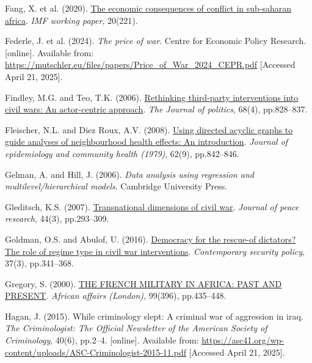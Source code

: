 \documentclass[
]{article}
\newlength{\cslhangindent}
\newenvironment{CSLReferences}[2] %
 {\begin{list}{}{%
  \setlength{\itemindent}{0pt}
  \setlength{\leftmargin}{0pt}
  \setlength{\parsep}{0pt}
  \ifodd #1
   \setlength{\leftmargin}{\cslhangindent}
   \setlength{\itemindent}{-1\cslhangindent}
  \fi
  \setlength{\itemsep}{#2\baselineskip}}}
 {\end{list}}
\begin{document}
\begin{CSLReferences}{0}{1}
Fang, X. et al. (2020).
\href{https://doi.org/10.5089/9781513559667.001}{The economic
consequences of conflict in sub-saharan africa}. \emph{IMF working
paper}, 20(221).

Federle, J. et al. (2024). \emph{The price of war}. Centre for Economic
Policy Research. {[}online{]}. Available from:
\url{https://mutschler.eu/files/papers/Price_of_War_2024_CEPR.pdf}
{[}Accessed April 21, 2025{]}.

Findley, M.G. and Teo, T.K. (2006).
\href{https://doi.org/10.1111/j.1468-2508.2006.00473.x}{Rethinking
third-party interventions into civil wars: An actor-centric approach}.
\emph{The Journal of politics}, 68(4), pp.828--837.

Fleischer, N.L. and Diez Roux, A.V. (2008).
\href{https://doi.org/10.1136/jech.2007.067371}{Using directed acyclic
graphs to guide analyses of neighbourhood health effects: An
introduction}. \emph{Journal of epidemiology and community health
(1979)}, 62(9), pp.842--846.

Gelman, A. and Hill, J. (2006). \emph{Data analysis using regression and
multilevel/hierarchical models}. Cambridge University Press.

Gleditsch, K.S. (2007).
\href{https://doi.org/10.1177/0022343307076637}{Transnational dimensions
of civil war}. \emph{Journal of peace research}, 44(3), pp.293--309.

Goldman, O.S. and Abulof, U. (2016).
\href{https://doi.org/10.1080/13523260.2016.1228033}{Democracy for the
rescue-of dictators? The role of regime type in civil war
interventions}. \emph{Contemporary security policy}, 37(3), pp.341--368.

Gregory, S. (2000). \href{https://doi.org/10.1093/afraf/99.396.435}{THE
FRENCH MILITARY IN AFRICA: PAST AND PRESENT}. \emph{African affairs
(London)}, 99(396), pp.435--448.

Hagan, J. (2015). While criminology slept: A criminal war of aggression
in iraq. \emph{The Criminologist: The Official Newsletter of the
American Society of Criminology}, 40(6), pp.2--4. {[}online{]}.
Available from:
\url{https://asc41.org/wp-content/uploads/ASC-Criminologist-2015-11.pdf}
{[}Accessed April 21, 2025{]}.


\end{CSLReferences}
\end{document}

